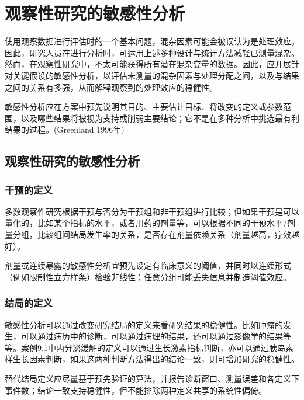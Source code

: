 \documentclass[
  chinese-hans,
  letterpaper,
  DIV=11,
  numbers=noendperiod]{scrreprt}
\begin{document}

\chapter{观察性研究的敏感性分析}\label{ux89c2ux5bdfux6027ux7814ux7a76ux7684ux654fux611fux6027ux5206ux6790}

使用观察数据进行评估时的一个基本问题，混杂因素可能会被误认为是处理效应。因此，研究人员在进行分析时，可运用上述多种设计与统计方法减轻已测量混杂。然而，在观察性研究中，不太可能获得所有潜在混杂变量的数据。因此，应开展针对关键假设的敏感性分析，以评估未测量的混杂因素与处理分配之间，以及与结果之间的关系有多强，从而解释观察到的处理效应的稳健性。

敏感性分析应在方案中预先说明其目的、主要估计目标、将改变的定义或参数范围，以及哪些结果将被视为支持或削弱主要结论；它不是在多种分析中挑选最有利结果的过程。(Greenland
1996年)

\section{观察性研究的敏感性分析}\label{ux89c2ux5bdfux6027ux7814ux7a76ux7684ux654fux611fux6027ux5206ux6790-1}

\subsection{干预的定义}\label{ux5e72ux9884ux7684ux5b9aux4e49}

多数观察性研究根据干预与否分为干预组和非干预组进行比较；但如果干预是可以量化的，比如某个指标的水平，或者用药的剂量等，可以根据不同的干预水平/剂量分组，比较组间结局发生率的关系，是否存在剂量依赖关系（剂量越高，疗效越好）。

剂量或连续暴露的敏感性分析宜预先设定有临床意义的阈值，并同时以连续形式（例如限制性立方样条）检验非线性；任意分组可能丢失信息并制造阈值效应。

\subsection{结局的定义}\label{ux7ed3ux5c40ux7684ux5b9aux4e49}

敏感性分析可以通过改变研究结局的定义来看研究结果的稳健性。比如肿瘤的发生，可以通过病历中的诊断，可以通过病理的结果，还可以通过影像学的结果等等。案例9.1中内分泌缓解的定义可以通过生长激素指标判断，亦可以通过胰岛素样生长因素判断，如果这两种判断方法得出的结论一致，则可增加研究的稳健性。

替代结局定义应尽量基于预先验证的算法，并报告诊断窗口、测量误差和各定义下事件数；结论一致支持稳健性，但不能排除两种定义共享的系统性偏倚。
\end{document}
